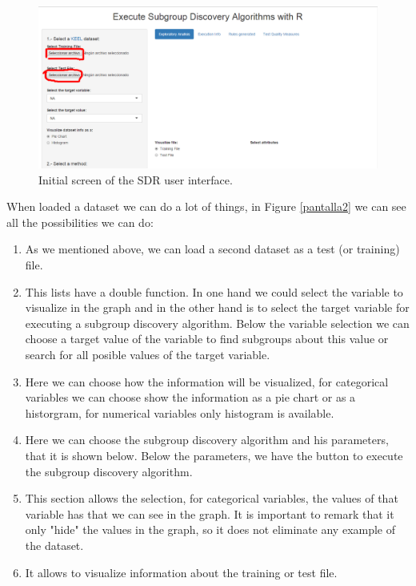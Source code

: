 \documentclass[]{article}
\begin{document}
\begin{figure}[hbtp]
  \centering
  \includegraphics[width=0.8\linewidth]{Interfaz1.png}
  \caption{Initial screen of the SDR user interface.}
  \label{pantallaInicial}
\end{figure}

\pagebreak
When loaded a dataset we can do a lot of things, in Figure
\ref{pantalla2} we can see all the possibilities we can do:

\begin{enumerate}
\item As we mentioned above, we can load a second dataset as a test (or training) file.
\item This lists have a double function. In one hand we could select the variable to visualize in the graph and in the other hand is to select the target variable for executing a subgroup discovery algorithm. Below the variable selection we can choose a target value of the variable to find subgroups about this value or search for all posible values of the target variable.
\item Here we can choose how the information will be visualized, for categorical variables we can choose show the information as a pie chart or as a historgram, for numerical variables only histogram is available.
\item Here we can choose the subgroup discovery algorithm  and his parameters, that it is shown below. Below the parameters, we have the button to execute the subgroup discovery algorithm.
\item This section allows the selection, for categorical variables, the values of that variable has that we can see in the graph. It is important to remark that it only "hide" the values in the graph, so it does not eliminate any example of the dataset.
\item It allows to visualize information about the training or test file.
\end{enumerate}
\end{document}
